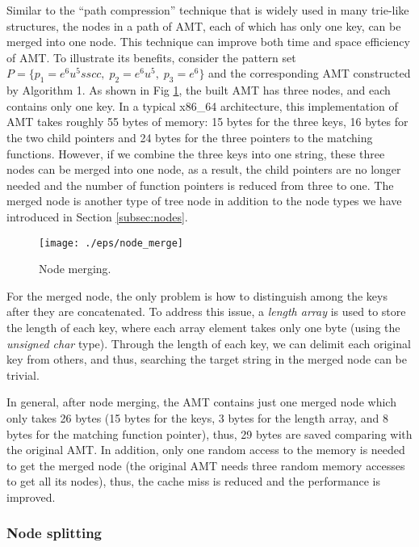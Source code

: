 Similar to the ``path compression'' technique that is widely used in
many trie-like structures, the nodes in a path of AMT, each of which
has only one key, can be merged into one node. This technique can
improve both time and space efficiency of AMT. To illustrate its
benefits, consider the pattern set
$P=\{p_1=e^6u^5sscc,\; p_2=e^6u^5,\; p_3=e^6\}$ and the corresponding
AMT constructed by Algorithm 1. As shown in Fig \ref{fig:merge}, the
built AMT has three nodes, and each contains only one key. In a
typical x86\_64 architecture, this implementation of AMT takes roughly
55 bytes of memory: 15 bytes for the three keys, 16 bytes for the two
child pointers and 24 bytes for the three pointers to the matching
functions. However, if we combine the three keys into one string,
these three nodes can be merged into one node, as a result, the child
pointers are no longer needed and the number of function pointers is
reduced from three to one. The merged node is another type of tree
node in addition to the node types we have introduced in Section
\ref{subsec:nodes}.

\begin{figure}[htbp]
  \centering
  \texttt{[image: ./eps/node\_merge]}
  \caption{Node merging.}
  \label{fig:merge}
\end{figure}

For the merged node, the only problem is how to distinguish among the
keys after they are concatenated. To address this issue, a
\emph{length array} is used to store the length of each key, where
each array element takes only one byte (using the \emph{unsigned char}
type). Through the length of each key, we can delimit each original
key from others, and thus, searching the target string in the merged
node can be trivial.

In general, after node merging, the AMT contains just one merged node
which only takes 26 bytes (15 bytes for the keys, 3 bytes for the
length array, and 8 bytes for the matching function pointer), thus, 29
bytes are saved comparing with the original AMT. In addition, only one
random access to the memory is needed to get the merged node (the
original AMT needs three random memory accesses to get all its nodes),
thus, the cache miss is reduced and the performance is improved.


\subsubsection{Node splitting}
\label{sec:node split}

